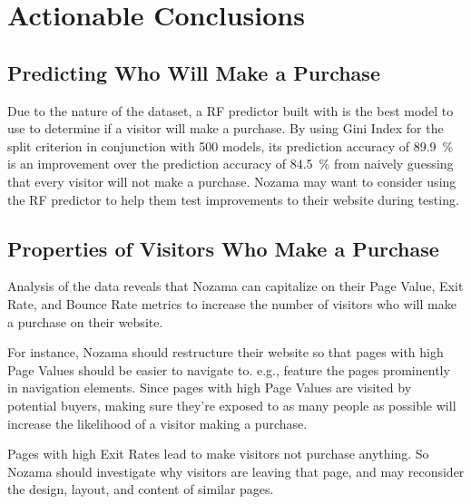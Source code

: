 \documentclass[../cmpe-251-project-report.tex]{subfiles}
\begin{document}
  \chapter{Actionable Conclusions}
  \label{ch:actionable-conclusions}
  \section{Predicting Who Will Make a Purchase}
  Due to the nature of the dataset, a RF predictor built with is the best model to use to determine if a visitor will make a purchase. By using Gini Index for the split criterion in conjunction with 500 models, its prediction accuracy of \qty{89.9}{\percent} is an improvement over the prediction accuracy of \qty{84.5}{\percent} from naively guessing that every visitor will not make a purchase. Nozama may want to consider using the RF predictor to help them test improvements to their website during testing.

  \section{Properties of Visitors Who Make a Purchase}
  Analysis of the data reveals that Nozama can capitalize on their Page Value, Exit Rate, and Bounce Rate metrics to increase the number of visitors who will make a purchase on their website.

  For instance, Nozama should restructure their website so that pages with high Page Values should be easier to navigate to. e.g., feature the pages prominently in navigation elements. Since pages with high Page Values are visited by potential buyers, making sure they're exposed to as many people as possible will increase the likelihood of a visitor making a purchase.

  Pages with high Exit Rates lead to make visitors not purchase anything. So Nozama should investigate why visitors are leaving that page, and may reconsider the design, layout, and content of similar pages.
\end{document}
